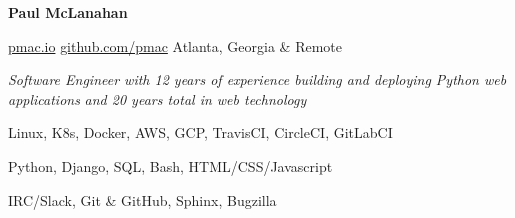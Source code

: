 \documentclass[11pt]{article} %
\begin{document}
\centerline{{\Huge \bf Paul McLanahan}}

\bigskip

        {\href{https://pmac.io}{pmac.io}}
        {\href{https://github.com/pmac}{github.com/pmac}}
        {Atlanta, Georgia \& Remote}


\center
\emph{Software Engineer with 12 years of experience building and deploying Python web applications}
\linebreak
\emph{and 20 years total in web technology}
\endcenter

      {Linux, K8s, Docker, AWS, GCP, TravisCI, CircleCI, GitLabCI}

      {Python, Django, SQL, Bash, HTML/CSS/Javascript}

      {IRC/Slack, Git \& GitHub, Sphinx, Bugzilla}

\end{document}
